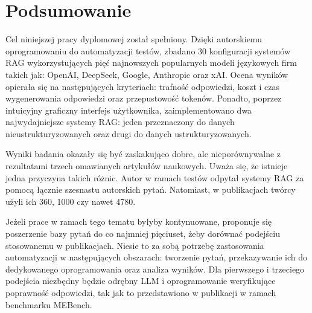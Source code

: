 \cleardoublepage

\chapter{Podsumowanie}
Cel niniejszej pracy dyplomowej został spełniony. Dzięki autorskiemu oprogramowaniu do automatyzacji testów, zbadano 30 konfiguracji systemów RAG wykorzystujących pięć najnowszych popularnych modeli językowych firm takich jak: OpenAI, DeepSeek, Google, Anthropic oraz xAI. Ocena wyników opierała się na następujących kryteriach: trafność odpowiedzi, koszt i czas wygenerowania odpowiedzi oraz przepustowość tokenów. Ponadto, poprzez intuicyjny graficzny interfejs użytkownika, zaimplementowano dwa najwydajniejsze systemy RAG: jeden przeznaczony do danych nieustrukturyzowanych oraz drugi do danych ustrukturyzowanych.

Wyniki badania okazały się być zaskakująco dobre, ale nieporównywalne z rezultatami trzech omawianych artykułów naukowych. Uważa się, że istnieje jedna przyczyna takich różnic. Autor w ramach testów odpytał systemy RAG za pomocą łącznie szesnastu autorskich pytań. Natomiast, w publikacjach twórcy użyli ich 360, 1000 czy nawet 4780.

Jeżeli prace w ramach tego tematu byłyby kontynuowane, proponuje się poszerzenie bazy pytań do co najmniej pięciuset, żeby dorównać podejściu stosowanemu w publikacjach. Niesie to za sobą potrzebę zastosowania automatyzacji w następujących obszarach: tworzenie pytań, przekazywanie ich do dedykowanego oprogramowania oraz analiza wyników. Dla pierwszego i trzeciego podejścia niezbędny będzie odrębny LLM i oprogramowanie weryfikujące poprawność odpowiedzi, tak jak to przedstawiono w publikacji \cite{art1_2025} w ramach benchmarku MEBench.
